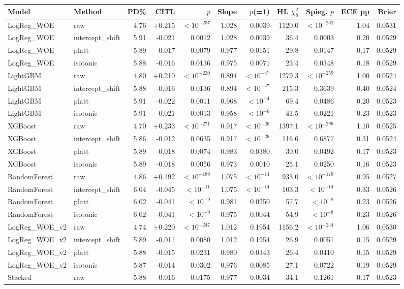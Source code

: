 \begin{tabular}{llrrrrrrrrr}
\toprule
Model & Method & PD\% & CITL & $p$ & Slope & $p$(=1) & HL $\chi^2_8$ & Spieg. $p$ & ECE pp & Brier \\
\midrule
LogReg\_WOE & raw & 4.76 & +0.215 & $<10^{-237}$ & 1.028 & 0.0039 & 1120.0 & $<10^{-232}$ & 1.04 & 0.0531 \\
LogReg\_WOE & intercept\_shift & 5.91 & -0.021 & 0.0012 & 1.028 & 0.0039 & 36.4 & 0.0003 & 0.20 & 0.0529 \\
LogReg\_WOE & platt & 5.89 & -0.017 & 0.0079 & 0.977 & 0.0151 & 29.8 & 0.0147 & 0.17 & 0.0529 \\
LogReg\_WOE & isotonic & 5.88 & -0.016 & 0.0136 & 0.975 & 0.0071 & 23.4 & 0.0348 & 0.18 & 0.0529 \\
LightGBM & raw & 4.80 & +0.210 & $<10^{-220}$ & 0.894 & $<10^{-47}$ & 1279.3 & $<10^{-259}$ & 1.00 & 0.0524 \\
LightGBM & intercept\_shift & 5.88 & -0.016 & 0.0136 & 0.894 & $<10^{-47}$ & 215.3 & 0.3639 & 0.40 & 0.0524 \\
LightGBM & platt & 5.91 & -0.022 & 0.0011 & 0.968 & $<10^{-4}$ & 69.4 & 0.0486 & 0.20 & 0.0523 \\
LightGBM & isotonic & 5.91 & -0.021 & 0.0013 & 0.958 & $<10^{-6}$ & 41.5 & 0.0221 & 0.23 & 0.0523 \\
XGBoost & raw & 4.70 & +0.233 & $<10^{-271}$ & 0.917 & $<10^{-26}$ & 1397.1 & $<10^{-299}$ & 1.10 & 0.0525 \\
XGBoost & intercept\_shift & 5.86 & -0.012 & 0.0635 & 0.917 & $<10^{-26}$ & 116.6 & 0.6877 & 0.31 & 0.0524 \\
XGBoost & platt & 5.89 & -0.018 & 0.0074 & 0.983 & 0.0380 & 30.0 & 0.0492 & 0.17 & 0.0523 \\
XGBoost & isotonic & 5.89 & -0.018 & 0.0056 & 0.973 & 0.0010 & 25.1 & 0.0250 & 0.16 & 0.0523 \\
RandomForest & raw & 4.86 & +0.192 & $<10^{-189}$ & 1.075 & $<10^{-14}$ & 933.0 & $<10^{-178}$ & 0.95 & 0.0527 \\
RandomForest & intercept\_shift & 6.04 & -0.045 & $<10^{-11}$ & 1.075 & $<10^{-14}$ & 103.3 & $<10^{-14}$ & 0.33 & 0.0526 \\
RandomForest & platt & 6.02 & -0.041 & $<10^{-9}$ & 0.981 & 0.0250 & 57.7 & $<10^{-8}$ & 0.23 & 0.0526 \\
RandomForest & isotonic & 6.02 & -0.041 & $<10^{-9}$ & 0.975 & 0.0044 & 54.9 & $<10^{-8}$ & 0.23 & 0.0526 \\
LogReg\_WOE\_v2 & raw & 4.74 & +0.220 & $<10^{-247}$ & 1.012 & 0.1954 & 1156.2 & $<10^{-244}$ & 1.06 & 0.0530 \\
LogReg\_WOE\_v2 & intercept\_shift & 5.89 & -0.017 & 0.0080 & 1.012 & 0.1954 & 26.9 & 0.0051 & 0.15 & 0.0529 \\
LogReg\_WOE\_v2 & platt & 5.88 & -0.015 & 0.0231 & 0.980 & 0.0343 & 26.4 & 0.0410 & 0.15 & 0.0529 \\
LogReg\_WOE\_v2 & isotonic & 5.87 & -0.014 & 0.0302 & 0.976 & 0.0085 & 27.1 & 0.0722 & 0.19 & 0.0529 \\
Stacked & raw & 5.88 & -0.016 & 0.0175 & 0.977 & 0.0034 & 34.1 & 0.1261 & 0.17 & 0.0523 \\
\bottomrule
\end{tabular}
